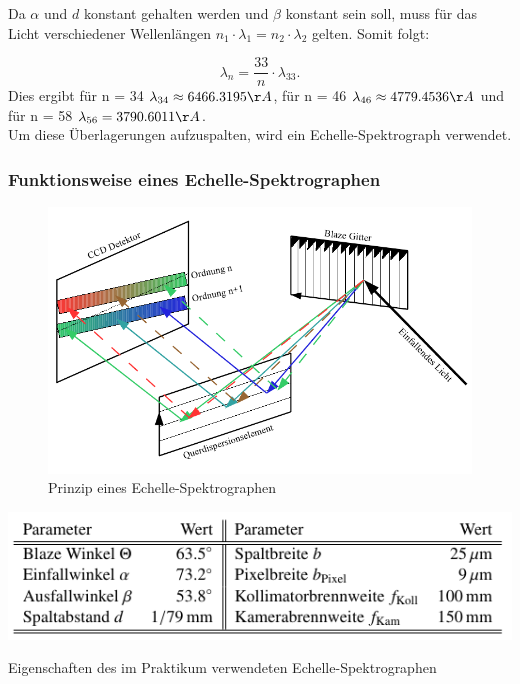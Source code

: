 Da $\alpha$ und $d$ konstant gehalten werden und $\beta$ konstant sein soll, muss für das Licht verschiedener Wellenlängen $n_1 \cdot \lambda_1 = n_2 \cdot \lambda_2$ gelten. Somit folgt: 

\begin{equation}
\lambda_n = \frac{33}{n} \cdot \lambda_{33}.
\end{equation}
Dies ergibt für n = 34 $\lambda_{34} \approx 6466.3195 \AA$, für n = 46 $\lambda_{46} \approx 4779.4536 \AA$ und für n = 58 $\lambda_{56} = 3790.6011 \AA$.\\

Um diese Überlagerungen aufzuspalten, wird ein Echelle-Spektrograph verwendet.

\subsubsection{Funktionsweise eines Echelle-Spektrographen}

\begin{figure}
		\includegraphics[width=.9\textwidth]{images/Abbildung104}
\caption{ Prinzip eines Echelle-Spektrographen }
\label{fig:104}
\end{figure}

\begin{table}
		\includegraphics[width=.9\textwidth]{images/Tabelle101}
\caption{ Eigenschaften des im Praktikum verwendeten Echelle-Spektrographen }
\label{tab:Echelle}
\end{table}

